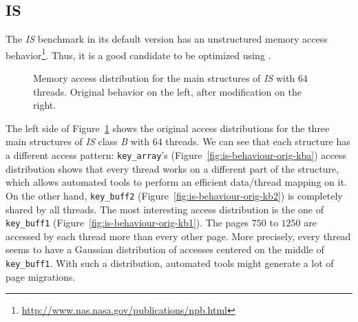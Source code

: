 \subsection{IS}
\label{sec:exp-is}

The \emph{IS} benchmark in its default version has an unstructured memory access behavior\footnote{\url{http://www.nas.nasa.gov/publications/npb.html}}. Thus, it is a good candidate to be optimized using \TABARNAC.
\begin{figure}[htb]
    \centering


    \caption{Memory access distribution for the main structures of
        \emph{IS} with $64$ threads. Original behavior on the left, after
    modification on the right.}
    \label{fig:is-behaviour}

\end{figure}



The left side of Figure~\ref{fig:is-behaviour} shows the original access distributions for the
three main structures of \emph{IS} class \emph{B} with $64$ threads. We can see that
each structure has a different access pattern: \texttt{key\_array}'s
(Figure~\ref{fig:is-behaviour-orig-kba}) access distribution shows that every
thread works on a different part of the structure, which allows automated
tools to perform an efficient data/thread mapping on it. On the other hand, \texttt{key\_buff2}
(Figure~\ref{fig:is-behaviour-orig-kb2}) is completely shared by all threads.
The most interesting access distribution is the one of \texttt{key\_buff1}
(Figure~\ref{fig:is-behaviour-orig-kb1}). The pages $750$ to $1250$ are
accessed by each thread more than every other page. More precisely, every
thread seems to have a Gaussian distribution of accesses centered on the
middle of \texttt{key\_buff1}. With such a distribution, automated tools might
generate a lot of page migrations.


